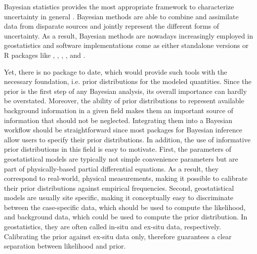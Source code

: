 Bayesian statistics provides the most appropriate framework to characterize uncertainty in general \citep{Hesse2019}. 
Bayesian methods are able to combine and assimilate data from disparate sources and jointly represent the different forms of uncertainty. 
As a result, Bayesian methods are nowadays increasingly employed in geostatistics and software implementations come as either standalone versions \citep{Vrugt2009-b, Rubin2010} or R packages like  \citep{Finley2015},  \citep{Lindgren2015},  \citep{Bakar2015},  \citep{Risser2020}, and  \citep{Savoy2017-b}. 

Yet, there is no package to date, which would provide such tools with the necessary foundation, i.e. prior distributions for the modeled quantities. 
Since the prior is the first step of any Bayesian analysis, its overall importance can hardly be overstated. 
Moreover, the ability of prior distributions to represent available background information in a given field makes them an important source of information that should not be neglected. 
Integrating them into a Bayesian workflow should be straightforward since most packages for Bayesian inference allow users to specify their prior distributions.
In addition, the use of informative prior distributions in this field is easy to motivate.
First, the parameters of geostatistical models are typically not simple convenience parameters but are part of physically-based partial differential equations. 
As a result, they correspond to real-world, physical measurements, making it possible to calibrate their prior distributions against empirical frequencies. 
Second, geostatistical models are usually site specific, making it conceptually easy to discriminate between the case-specific data, which should be used to compute the likelihood, and background data, which could be used to compute the prior distribution. 
In geostatistics, they are often called in-situ and ex-situ data, respectively.
Calibrating the prior against ex-situ data only, therefore guarantees a clear separation between likelihood and prior.

